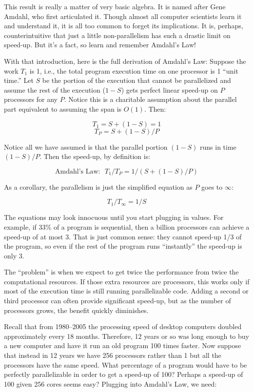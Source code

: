 \documentclass[10pt]{article}
\begin{document}
This result is really a matter of very basic algebra.  It is named
after Gene Amdahl, who first articulated it.  Though almost all computer
scientists learn it and understand it, it is all too common to forget
its implications.  It is, perhaps, counterintuitive that just a little
non-parallelism has such a drastic limit on speed-up.  But it's a
fact, so learn and remember Amdahl's Law!

With that introduction, here is the full derivation of Amdahl's Law:
Suppose the work $T_1$ is 1, i.e., the total program execution time on
one processor is 1 ``unit time.''  Let $S$ be the portion of the
execution that cannot be parallelized and assume the rest of the
execution ($1-S$) gets perfect linear speed-up on $P$ processors for
any $P$.  Notice this is a charitable assumption about the parallel
part equivalent to assuming the span is $O(1)$.  Then:

\[ T_1 = S + (1-S) = 1 \]
\[ T_P = S + (1-S)/P \]

Notice all we have assumed is that the parallel portion $(1-S)$ runs
in time $(1-S)/P$.  Then the speed-up, by definition is:

\[ \mbox{Amdahl's Law:}\ \ \ T_1/T_P = 1/(S+(1-S)/P) \]

As a corollary, the parallelism is just the simplified equation as $P$
goes to $\infty$:

\[ T_1/T_\infty = 1/S \]

The equations may look innocuous until you start plugging in values.
For example, if 33\% of a program is sequential, then a billion
processors can achieve a speed-up of at most 3.  That is just common
sense: they cannot speed-up 1/3 of the program, so even if the rest of
the program runs ``instantly'' the speed-up is only 3.

The ``problem'' is when we expect to get twice the performance from
twice the computational resources.  If those extra resources are
processors, this works only if most of the execution time is still
running parallelizable code.  Adding a second or third processor can
often provide significant speed-up, but as the number of processors
grows, the benefit quickly diminishes.

Recall that from 1980--2005 the processing speed of desktop computers
doubled approximately every 18 months.  Therefore, 12 years or so was
long enough to buy a new computer and have it run an old program 100
times faster.  Now suppose that instead in 12 years we have 256
processors rather than 1 but all the processors have the same speed.
What percentage of a program would have to be perfectly parallelizable
in order to get a speed-up of 100?  Perhaps a speed-up of 100 given
256 cores seems easy?  Plugging into Amdahl's Law, we need:
\end{document}
